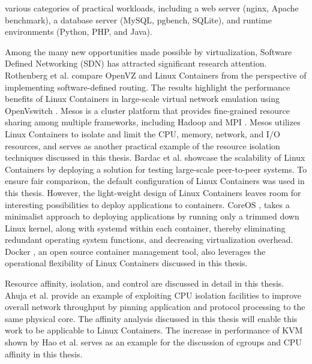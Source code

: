 various categories of practical workloads, including a web server (nginx, Apache benchmark), a database server (MySQL, pgbench, SQLite), and runtime environments (Python, PHP, and Java).


Among the many new opportunities made possible by virtualization, Software Defined Networking (SDN) has attracted significant research attention. Rothenberg et al. \cite{sdn1} compare OpenVZ and Linux Containers from the perspective of implementing software-defined routing. The results highlight the performance benefits of Linux Containers in large-scale virtual network emulation using OpenVswitch \cite{openvswitch}. Mesos \cite{mesos} is a cluster platform that provides fine-grained resource sharing among multiple frameworks, including Hadoop \cite{hadoop} and MPI \cite{mpi}. Mesos utilizes Linux Containers to isolate and limit the CPU, memory, network, and I/O resources, and serves as another practical example of the resource isolation techniques discussed in this thesis. Bardac et al. \cite{peer} showcase the scalability of Linux Containers by deploying a solution for testing large-scale peer-to-peer systems. To ensure fair comparison, the default configuration of Linux Containers was used in this thesis. However, the light-weight design of Linux Containers leaves room for interesting possibilities to deploy applications to containers. CoreOS \cite{coreos}, takes a minimalist approach to deploying applications by running only a trimmed down Linux kernel, along with systemd within each container, thereby eliminating redundant operating system functions, and decreasing virtualization overhead. Docker \cite{docker}, an open source container management tool, also leverages the operational flexibility of Linux Containers discussed in this thesis.


Resource affinity, isolation, and control are discussed in detail in this thesis. Ahuja et al. \cite{cacheaware} provide an example of exploiting CPU isolation facilities to improve overall network throughput by pinning application and protocol processing to the same physical core. The affinity analysis discussed in this thesis will enable this work to be applicable to Linux Containers. The increase in performance of KVM shown by  Hao et al. \cite{kvmaffinity} serves as an example for the discussion of cgroups and CPU affinity in this thesis.














